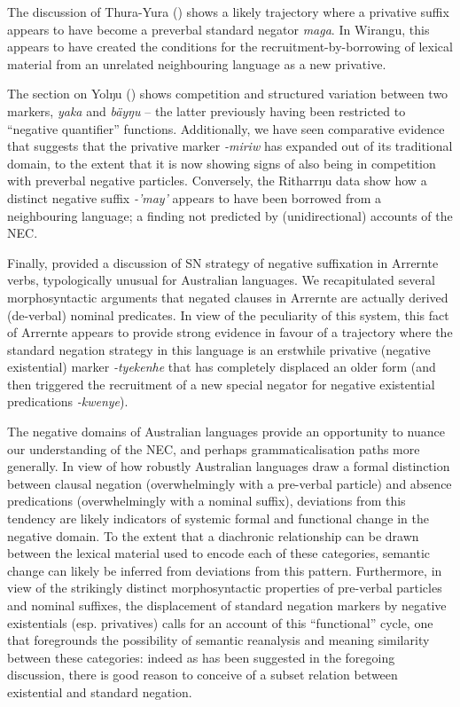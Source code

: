 \documentclass[output=paper,draft,draftmode,colorlinks,citecolor=brown]{langscibook}
\begin{document}
The discussion of Thura-Yura () shows a likely trajectory where a privative suffix appears to have become a preverbal standard negator \textit{maga}. In Wirangu, this appears to have created the conditions for the recruitment-by-borrowing of lexical material from an unrelated neighbouring language as a new privative.

The section on Yolŋu () shows competition and structured variation between two markers, \textit{yaka} and \textit{bäyŋu} -- the latter previously having been restricted to ``negative quantifier'' functions. Additionally, we have seen comparative evidence that suggests that the privative marker \textit{-miriw} has expanded out of its traditional domain, to the extent that it is now showing signs of also being in competition with preverbal negative particles. Conversely, the Ritharrŋu data show how a distinct negative suffix \textit{-'may'} appears to have been borrowed from a neighbouring language; a finding not predicted by (unidirectional) accounts of the NEC.

Finally,  provided a discussion of SN strategy of negative suffixation in Arrernte verbs, typologically unusual for Australian languages. We recapitulated several morphosyntactic arguments that negated clauses in Arrernte are actually derived (de-verbal) nominal predicates. In view of the peculiarity of this system, this fact of Arrernte appears to provide strong evidence in favour of a trajectory where the standard negation strategy in this language is an erstwhile privative (negative existential) marker \textit{-tye\textdblhyphen kenhe} that has completely displaced an older form (and then triggered the recruitment of a new special negator for negative existential predications \textit{-kwenye}).

The negative domains of Australian languages provide an opportunity to
    nuance our understanding of the NEC, and perhaps grammaticalisation
    paths more generally. In view of how robustly Australian languages draw
    a formal distinction between clausal negation (overwhelmingly with a
    pre-verbal particle) and absence predications (overwhelmingly with a
    nominal suffix), deviations from this tendency are likely indicators of
    systemic formal and functional change in the negative domain. To the
    extent that a diachronic relationship can be drawn between the lexical
    material used to encode each of these categories, semantic change can
    likely be inferred from deviations from this pattern. Furthermore, in
    view of the strikingly distinct morphosyntactic properties of
    pre-verbal particles and nominal suffixes, the displacement of standard
    negation markers by negative existentials (esp. privatives) calls for
    an account of this ``functional'' cycle, one that foregrounds the
    possibility of semantic reanalysis and meaning similarity between these
    categories: indeed as has been suggested in the foregoing discussion,
    there is good reason to conceive of a subset relation between
    existential and standard negation.
\end{document}
